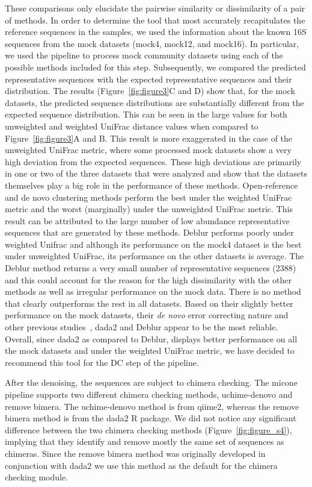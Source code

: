   These comparisons only elucidate the pairwise similarity or dissimilarity of a pair of methods.
  In order to determine the tool that most accurately recapitulates the reference sequences in the samples, we used the information about the known 16S sequences from the mock datasets (mock4, mock12, and mock16).
  In particular, we used the pipeline to process mock community datasets using each of the possible methods included for this step.
  Subsequently, we compared the predicted representative sequences with the expected representative sequences and their distribution.
  The results (Figure~\ref{fig:figure3}C and D) show that, for the mock datasets, the predicted sequence distributions are substantially different from the expected sequence distribution.
  This can be seen in the large values for both unweighted and weighted UniFrac distance values when compared to Figure~\ref{fig:figure3}A and B.
  This result is more exaggerated in the case of the unweighted UniFrac metric, where some processed mock datasets show a very high deviation from the expected sequences.
  These high deviations are primarily in one or two of the three datasets that were analyzed and show that the datasets themselves play a big role in the performance of these methods.
  Open-reference and de novo clustering methods perform the best under the weighted UniFrac metric and the worst (marginally) under the unweighted UniFrac metric.
  This result can be attributed to the large number of low abundance representative sequences that are generated by these methods.
  Deblur performs poorly under weighted Unifrac and although its performance on the mock4 dataset is the best under unweighted UniFrac, its performance on the other datasets is average.
  The Deblur method returns a very small number of representative sequences (2388) and this could account for the reason for the high dissimilarity with the other methods as well as irregular performance on the mock data.
  There is no method that clearly outperforms the rest in all datasets.
  Based on their slightly better performance on the mock datasets, their \textit{de novo} error correcting nature and other previous studies~\cite{Nearing2018}, \ac{dada2} and Deblur appear to be the most reliable.
  Overall, since \ac{dada2} as compared to Deblur, displays better performance on all the mock datasets and under the weighted UniFrac metric, we have decided to recommend this tool for the DC step of the pipeline.

  After the denoising, the sequences are subject to chimera checking.
  The \ac{micone} pipeline supports two different chimera checking methods, uchime-denovo and remove bimera.
  The uchime-denovo method is from \ac{qiime2}, whereas the remove bimera method is from the \ac{dada2} R package.
  We did not notice any significant difference between the two chimera checking methods (Figure~\ref{fig:figure_s4}), implying that they identify and remove mostly the same set of sequences as chimeras.
  Since the remove bimera method was originally developed in conjunction with dada2 we use this method as the default for the chimera checking module.

